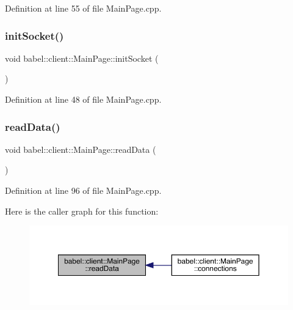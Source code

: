 Definition at line 55 of file Main\+Page.\+cpp.

\mbox{\label{classbabel_1_1client_1_1_main_page_ac26d6673b35dd999441c4d4e0ac75167}} 
\subsubsection{\texorpdfstring{init\+Socket()}{initSocket()}}
{\footnotesize\ttfamily void babel\+::client\+::\+Main\+Page\+::init\+Socket (\begin{DoxyParamCaption}{ }\end{DoxyParamCaption})}



Definition at line 48 of file Main\+Page.\+cpp.

\mbox{\label{classbabel_1_1client_1_1_main_page_a4d08b1d3f23a58f937e7bb716317b924}} 
\subsubsection{\texorpdfstring{read\+Data()}{readData()}}
{\footnotesize\ttfamily void babel\+::client\+::\+Main\+Page\+::read\+Data (\begin{DoxyParamCaption}{ }\end{DoxyParamCaption})}



Definition at line 96 of file Main\+Page.\+cpp.

Here is the caller graph for this function\+:\nopagebreak
\begin{figure}[H]
\begin{center}
\leavevmode
\includegraphics[width=350pt]{classbabel_1_1client_1_1_main_page_a4d08b1d3f23a58f937e7bb716317b924_icgraph}
\end{center}
\end{figure}
\mbox{\label{classbabel_1_1client_1_1_main_page_ae2447ec4e19e7694afc106ccb52a0d43}} 
